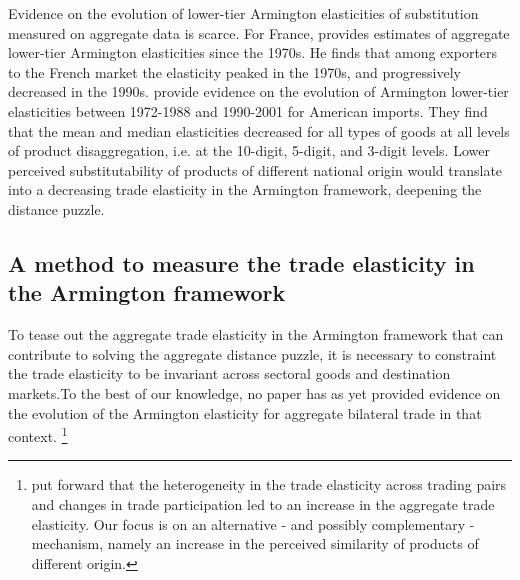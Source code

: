 \documentclass[12pt,twoside,a4paper,notitlepage]{article}
\begin{document}
Evidence on the evolution of lower-tier Armington elasticities of substitution measured on aggregate data is scarce.
For France, \cite{Welsch2006} provides estimates of aggregate lower-tier Armington elasticities since the 1970s.
He finds that among exporters to the French market the elasticity peaked in the 1970s, and progressively decreased in the 1990s.
\cite{Broda2006} provide evidence on the evolution of Armington lower-tier elasticities between 1972-1988 and 1990-2001 for American imports.
They find that the mean and median elasticities decreased for all types of goods at all levels of product disaggregation, i.e.
at the 10-digit, 5-digit, and 3-digit levels.
Lower perceived substitutability of products of different national origin would translate into a decreasing trade elasticity in the Armington framework,  deepening the distance puzzle. 

\subsection{ A method to measure the trade elasticity in the Armington framework}

To tease out the aggregate trade elasticity in the Armington framework that can contribute to solving the aggregate distance puzzle, it is necessary to  constraint the trade elasticity to be invariant across sectoral goods and destination markets.To the best of our knowledge, no paper has as yet provided evidence on the evolution of the Armington elasticity for aggregate bilateral trade in that context. \footnote{\cite{Head2013} put forward that the heterogeneity in the trade elasticity across trading pairs and changes in trade participation led to an increase in the aggregate trade elasticity. Our focus is on an alternative - and possibly complementary - mechanism, namely an increase in the perceived similarity of products of different origin.} 
\end{document}
